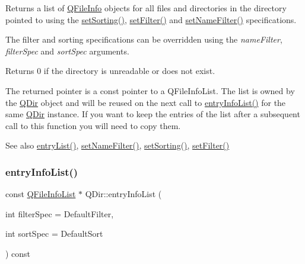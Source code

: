 Returns a list of \mbox{\hyperlink{class_q_file_info}{Q\+File\+Info}} objects for all files and directories in the directory pointed to using the \mbox{\hyperlink{class_q_dir_a65280d204cd65975953e3eb2a63da778}{set\+Sorting()}}, \mbox{\hyperlink{class_q_dir_a68d9e723870b5f8226353dc6047a35ee}{set\+Filter()}} and \mbox{\hyperlink{class_q_dir_a26b95e183a9ba9410219a3ce4d8c3416}{set\+Name\+Filter()}} specifications.

The filter and sorting specifications can be overridden using the {\itshape name\+Filter}, {\itshape filter\+Spec} and {\itshape sort\+Spec} arguments.

Returns 0 if the directory is unreadable or does not exist.

The returned pointer is a const pointer to a Q\+File\+Info\+List. The list is owned by the \mbox{\hyperlink{class_q_dir}{Q\+Dir}} object and will be reused on the next call to \mbox{\hyperlink{class_q_dir_ada9ea9da108cbebd0ac88231f39fced0}{entry\+Info\+List()}} for the same \mbox{\hyperlink{class_q_dir}{Q\+Dir}} instance. If you want to keep the entries of the list after a subsequent call to this function you will need to copy them.

\begin{DoxySeeAlso}{See also}
\mbox{\hyperlink{class_q_dir_ab5e2b4ce772dc4b8941425cf780df9ab}{entry\+List()}}, \mbox{\hyperlink{class_q_dir_a26b95e183a9ba9410219a3ce4d8c3416}{set\+Name\+Filter()}}, \mbox{\hyperlink{class_q_dir_a65280d204cd65975953e3eb2a63da778}{set\+Sorting()}}, \mbox{\hyperlink{class_q_dir_a68d9e723870b5f8226353dc6047a35ee}{set\+Filter()}} 
\end{DoxySeeAlso}
\mbox{\label{class_q_dir_ada9ea9da108cbebd0ac88231f39fced0}} 
\subsubsection{\texorpdfstring{entryInfoList()}{entryInfoList()}\hspace{0.1cm}{\footnotesize\ttfamily [2/2]}}
{\footnotesize\ttfamily const \mbox{\hyperlink{class_q_internal_list}{Q\+File\+Info\+List}} $\ast$ Q\+Dir\+::entry\+Info\+List (\begin{DoxyParamCaption}\item[{int}]{filter\+Spec = {\ttfamily DefaultFilter},  }\item[{int}]{sort\+Spec = {\ttfamily DefaultSort} }\end{DoxyParamCaption}) const\hspace{0.3cm}{\ttfamily [virtual]}}

